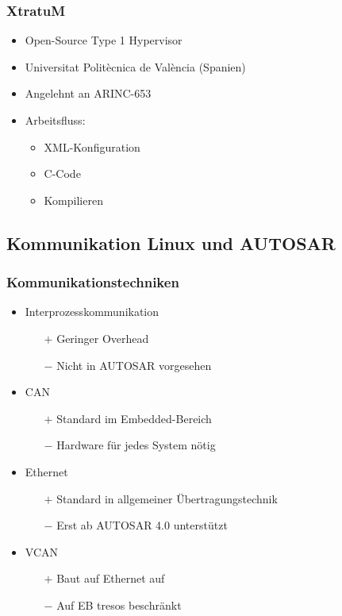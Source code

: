 \documentclass[]{beamer}
\begin{document}
\begin{frame}
\frametitle{XtratuM}
    \begin{itemize}
        \item Open-Source Type 1 Hypervisor
        \item Universitat Politècnica de València (Spanien)
        \item Angelehnt an ARINC-653
        \item Arbeitsfluss:
        \begin{itemize}
            \item XML-Konfiguration
            \item C-Code
            \item Kompilieren
        \end{itemize}
    \end{itemize}
\end{frame}


\subsection{Kommunikation Linux und AUTOSAR}
\begin{frame}
\frametitle{Kommunikationstechniken}

    \begin{itemize}
        \pause
        \item Interprozesskommunikation
        \begin{itemize}
            \item[$ + $] Geringer Overhead
            \item[$ - $] Nicht in AUTOSAR vorgesehen
        \end{itemize}
        \pause
        \item CAN
        \begin{itemize}
            \item[$ + $] Standard im Embedded-Bereich
            \item[$ - $] Hardware für jedes System nötig
        \end{itemize}
        \pause
        \item Ethernet
        \begin{itemize}
            \item[$ + $] Standard in allgemeiner Übertragungstechnik
            \item[$ - $] Erst ab AUTOSAR 4.0 unterstützt
        \end{itemize}
        \pause
        \item VCAN
        \begin{itemize}
            \item[$ + $] Baut auf Ethernet auf
            \item[$ - $] Auf EB tresos beschränkt
        \end{itemize}
    \end{itemize}

\end{frame}
\end{document}
